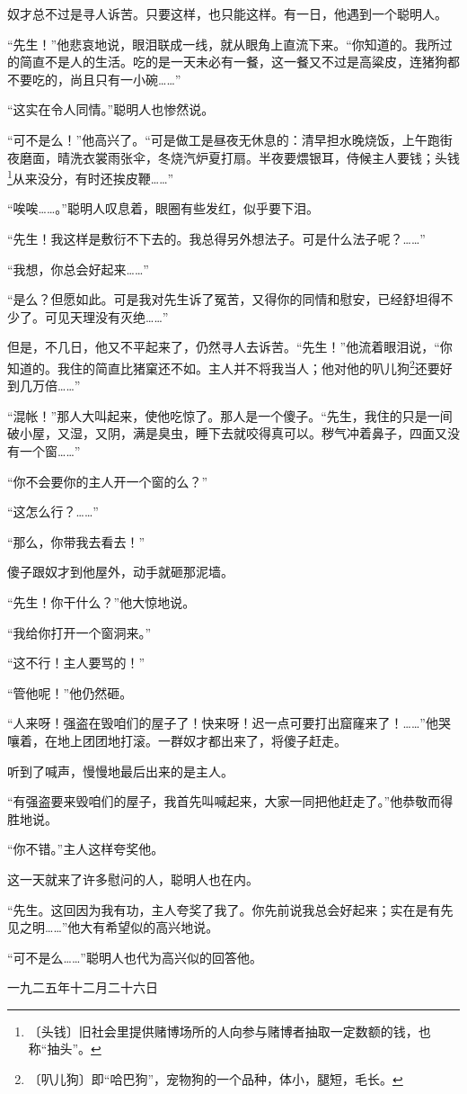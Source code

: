 \documentclass[12pt,UTF-8,openany]{ctexbook}
\begin{document}
\begin{normalsize}
    
    奴才总不过是寻人诉苦。只要这样，也只能这样。有一日，他遇到一个聪明人。
    
    “先生！”他悲哀地说，眼泪联成一线，就从眼角上直流下来。“你知道的。我所过的简直不是人的生活。吃的是一天未必有一餐，这一餐又不过是高粱皮，连猪狗都不要吃的，尚且只有一小碗……”
    
    “这实在令人同情。”聪明人也惨然说。
    
    “可不是么！”他高兴了。“可是做工是昼夜无休息的：清早担水晚烧饭，上午跑街夜磨面，晴洗衣裳雨张伞，冬烧汽炉夏打扇。半夜要煨银耳，侍候主人要钱；头钱\footnote{〔头钱〕旧社会里提供赌博场所的人向参与赌博者抽取一定数额的钱，也称“抽头”。}从来没分，有时还挨皮鞭……”
    
    “唉唉……。”聪明人叹息着，眼圈有些发红，似乎要下泪。
    
    “先生！我这样是敷衍不下去的。我总得另外想法子。可是什么法子呢？……”
    
    “我想，你总会好起来……”
    
    “是么？但愿如此。可是我对先生诉了冤苦，又得你的同情和慰安，已经舒坦得不少了。可见天理没有灭绝……”
    
    但是，不几日，他又不平起来了，仍然寻人去诉苦。“先生！”他流着眼泪说，“你知道的。我住的简直比猪窠还不如。主人并不将我当人；他对他的叭儿狗\footnote{〔叭儿狗〕即“哈巴狗”，宠物狗的一个品种，体小，腿短，毛长。}还要好到几万倍……”
    
    “混帐！”那人大叫起来，使他吃惊了。那人是一个傻子。“先生，我住的只是一间破小屋，又湿，又阴，满是臭虫，睡下去就咬得真可以。秽气冲着鼻子，四面又没有一个窗……”
    
    “你不会要你的主人开一个窗的么？”
    
    “这怎么行？……”
    
    “那么，你带我去看去！”
    
    傻子跟奴才到他屋外，动手就砸那泥墙。
    
    “先生！你干什么？”他大惊地说。
    
    “我给你打开一个窗洞来。”
    
    “这不行！主人要骂的！”
    
    “管他呢！”他仍然砸。
    
    “人来呀！强盗在毁咱们的屋子了！快来呀！迟一点可要打出窟窿来了！……”他哭嚷着，在地上团团地打滚。一群奴才都出来了，将傻子赶走。
    
    听到了喊声，慢慢地最后出来的是主人。
    
    “有强盗要来毁咱们的屋子，我首先叫喊起来，大家一同把他赶走了。”他恭敬而得胜地说。
    
    “你不错。”主人这样夸奖他。
    
    这一天就来了许多慰问的人，聪明人也在内。
    
    “先生。这回因为我有功，主人夸奖了我了。你先前说我总会好起来；实在是有先见之明……”他大有希望似的高兴地说。
    
    “可不是么……”聪明人也代为高兴似的回答他。
    
    \hfill 一九二五年十二月二十六日
    
\end{normalsize}
\end{document}
